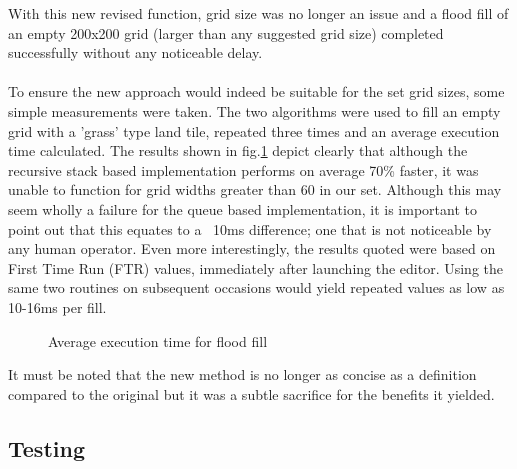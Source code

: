 With this new revised function, grid size was no longer an issue and a flood fill of an empty 200x200 grid (larger than any suggested grid size) completed successfully without any noticeable delay.
\paragraph{}
To ensure the new approach would indeed be suitable for the set grid sizes, some simple measurements were taken. The two algorithms were used to fill an empty grid with a 'grass' type land tile, repeated three times and an average execution time calculated. The results shown in fig.\ref{fig:floodChart} depict clearly that although the recursive stack based implementation performs on average 70\% faster, it was unable to function for grid widths greater than 60 in our set. Although this may seem wholly a failure for the queue based implementation, it is important to point out that this equates to a ~10ms difference; one that is not noticeable by any human operator.  Even more interestingly, the results quoted were based on First Time Run (FTR) values, immediately after launching the editor. Using the same two routines on subsequent occasions would yield repeated values as low as 10-16ms per fill.
 
\begin{figure}[h]
\centering
{}
\caption{Average execution time for flood fill}
\label{fig:floodChart}
\end{figure}

It must be noted that the new method is no longer as concise as a definition compared to the original but it was a subtle sacrifice for the benefits it yielded.

\subsection{Testing}

